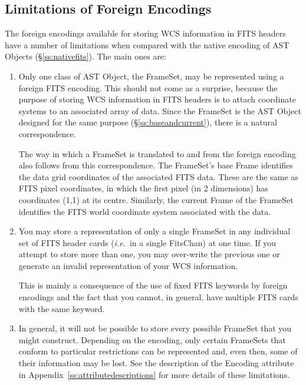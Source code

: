 \documentclass[twoside,11pt]{article}
\newcommand{\appref}[1]{Appendix~\ref{#1}}
\newcommand{\secref}[1]{\S\ref{#1}}
\newcommand{\appref}[1]{\ref{#1}}
\newcommand{\secref}[1]{\ref{#1}}
\begin{document}
\subsection{\label{ss:foreignfitslimitations}Limitations of Foreign Encodings}

The foreign encodings available for storing WCS information in FITS
headers have a number of limitations when compared with the native
encoding of AST Objects (\secref{ss:nativefits}). The main ones are:

\begin{enumerate}
\item Only one class of AST Object, the FrameSet, may be represented
using a foreign FITS encoding. This should not come as a surprise,
because the purpose of storing WCS information in FITS headers is to
attach coordinate systems to an associated array of data. Since the
FrameSet is the AST Object designed for the same purpose
(\secref{ss:baseandcurrent}), there is a natural correspondence.

The way in which a FrameSet is translated to and from the foreign
encoding also follows from this correspondence. The FrameSet's base
Frame identifies the data grid coordinates of the associated FITS
data. These are the same as FITS pixel coordinates, in which the first
pixel (in 2 dimensions) has coordinates (1,1) at its
centre. Similarly, the current Frame of the FrameSet identifies the
FITS world coordinate system associated with the data.

\item You may store a representation of only a single FrameSet in any
individual set of FITS header cards ({\em{i.e.}}\ in a single
FitsChan) at one time. If you attempt to store more than one, you may
over-write the previous one or generate an invalid representation of
your WCS information.

This is mainly a consequence of the use of fixed FITS keywords by
foreign encodings and the fact that you cannot, in general, have
multiple FITS cards with the same keyword.

\item In general, it will not be possible to store every possible
FrameSet that you might construct. Depending on the encoding, only
certain FrameSets that conform to particular restrictions can be
represented and, even then, some of their information may be lost. See
the description of the Encoding attribute in
\appref{ss:attributedescriptions} for more details of these
limitations.
\end{enumerate}
\end{document}
